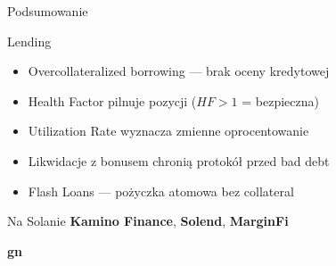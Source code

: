 \begin{frame}{Podsumowanie}
  \begin{block}{Lending}
    \begin{itemize}
      \item Overcollateralized borrowing --- brak oceny kredytowej
      \item Health Factor pilnuje pozycji ($HF > 1$ = bezpieczna)
      \item Utilization Rate wyznacza zmienne oprocentowanie
      \item Likwidacje z bonusem chronią protokół przed bad debt
      \item Flash Loans --- pożyczka atomowa bez collateral
    \end{itemize}
  \end{block}
  \vspace{0.4cm}
  \begin{exampleblock}{Na Solanie}
    \textbf{Kamino Finance}, \textbf{Solend}, \textbf{MarginFi}
  \end{exampleblock}
\end{frame}

\begin{frame}[plain]
  \begin{center}
    \vfill
    {\Huge\bfseries\color{stplwhite} gn}
    \vfill
  \end{center}
\end{frame}


